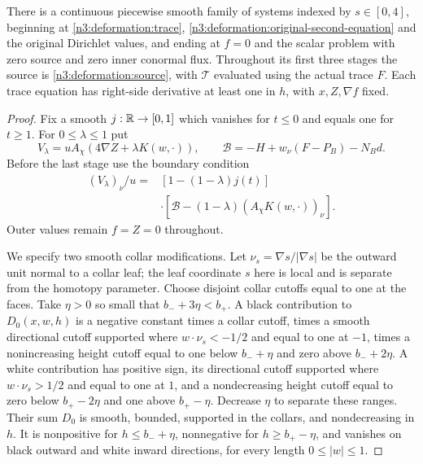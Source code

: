 \begin{proposition}\label{n3:deformation:homotopy}
There is a continuous piecewise smooth family of systems indexed by
$s\in[0,4]$, beginning at
\eqref{n3:deformation:trace}, \eqref{n3:deformation:original-second-equation}
and the original Dirichlet values, and ending at $f=0$ and the scalar
problem with zero source and zero inner conormal flux.
Throughout its first three stages the source is
\eqref{n3:deformation:source}, with $\mathcal T$ evaluated using the actual
trace $F$. Each trace equation has right-side derivative at least one
in $h$, with $x,Z,\nabla f$ fixed.
\end{proposition}

\begin{proof}
Fix a smooth $j:\mathbb R\to[0,1]$ which vanishes for $t\le0$ and equals one
for $t\ge1$. For $0\le\lambda\le1$ put
\[
 V_\lambda=uA_\chi(4\nabla Z+\lambda K(w,\cdot)),\qquad
 \mathcal B=-H+w_\nu(F-P_B)-N_Bd.
\]
Before the last stage use the boundary condition
\begin{equation}\label{n3:deformation:homotopy-boundary}
 \begin{split}
 (V_\lambda)_\nu/u
 ={}&[1-(1-\lambda)j(t)]\\
 &\cdot[\mathcal B-(1-\lambda)(A_\chi K(w,\cdot))_\nu].
 \end{split}
\end{equation}
Outer values remain $f=Z=0$ throughout.

We specify two smooth collar modifications. Let
$\nu_s=\nabla s/|\nabla s|$ be the outward unit normal to a collar leaf;
the leaf coordinate $s$ here is local and is separate from the homotopy
parameter. Choose disjoint collar cutoffs equal to one at the faces.
Take $\eta>0$ so small that $b_-+3\eta<b_+$.
A black contribution to $D_0(x,w,h)$ is a negative constant times a
collar cutoff, times a smooth directional cutoff supported where
$w\cdot\nu_s<-1/2$ and equal to one at $-1$, times a nonincreasing
height cutoff equal to one below $b_-+\eta$ and zero above $b_-+2\eta$.
A white contribution has positive sign, its directional cutoff supported
where $w\cdot\nu_s>1/2$ and equal to one at $1$, and a nondecreasing
height cutoff equal to zero below $b_+-2\eta$ and one above $b_+-\eta$.
Decrease $\eta$ to separate these ranges. Their sum $D_0$ is smooth,
bounded, supported in the collars, and nondecreasing in $h$.
It is nonpositive for $h\le b_-+\eta$, nonnegative for
$h\ge b_+-\eta$, and vanishes on black outward and white inward
directions, for every length $0\le|w|\le1$.


\end{proof}

